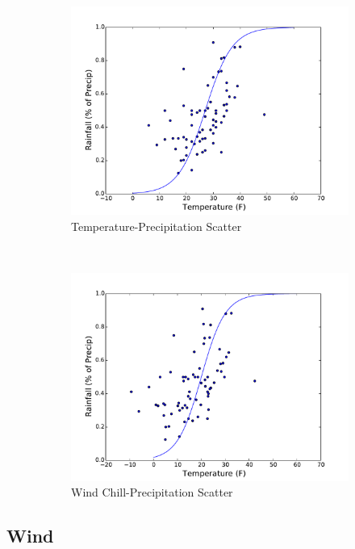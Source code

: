 \documentclass[11pt, letterpaper]{article}
\begin{document}
\begin{figure}[H]
  \centering
  \begin{subfigure}[b]{0.45\textwidth}
    \includegraphics[width=\textwidth]{figures/daily_temp_precip_scatter.pdf}
    \caption{Temperature-Precipitation Scatter}
  \end{subfigure}
  ~
  \begin{subfigure}[b]{0.45\textwidth}
    \includegraphics[width=\textwidth]{figures/daily_wind_chill_precip_scatter.pdf}
    \caption{Wind Chill-Precipitation Scatter}
  \end{subfigure}
  \caption{}
\end{figure}

\subsection{Wind}
\end{document}
